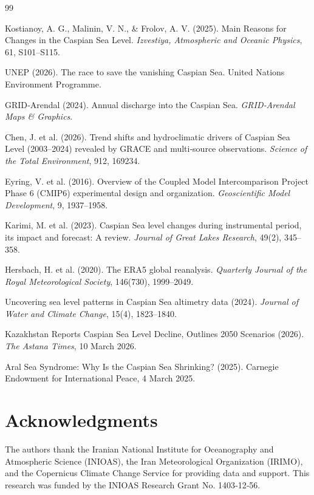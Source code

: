 \documentclass[12pt,a4paper]{article}
\begin{document}
\begin{thebibliography}{99}

Kostianoy, A. G., Malinin, V. N., \& Frolov, A. V. (2025).
Main Reasons for Changes in the Caspian Sea Level.
\textit{Izvestiya, Atmospheric and Oceanic Physics}, 61, S101–S115.

UNEP (2026).
The race to save the vanishing Caspian Sea.
United Nations Environment Programme.

GRID‑Arendal (2024).
Annual discharge into the Caspian Sea.
\textit{GRID‑Arendal Maps \& Graphics}.

Chen, J. et al. (2026).
Trend shifts and hydroclimatic drivers of Caspian Sea Level (2003–2024) revealed by GRACE and multi‑source observations.
\textit{Science of the Total Environment}, 912, 169234.

Eyring, V. et al. (2016).
Overview of the Coupled Model Intercomparison Project Phase 6 (CMIP6) experimental design and organization.
\textit{Geoscientific Model Development}, 9, 1937–1958.

Karimi, M. et al. (2023).
Caspian Sea level changes during instrumental period, its impact and forecast: A review.
\textit{Journal of Great Lakes Research}, 49(2), 345–358.

Hersbach, H. et al. (2020).
The ERA5 global reanalysis.
\textit{Quarterly Journal of the Royal Meteorological Society}, 146(730), 1999–2049.

Uncovering sea level patterns in Caspian Sea altimetry data (2024).
\textit{Journal of Water and Climate Change}, 15(4), 1823–1840.

Kazakhstan Reports Caspian Sea Level Decline, Outlines 2050 Scenarios (2026).
\textit{The Astana Times}, 10 March 2026.

Aral Sea Syndrome: Why Is the Caspian Sea Shrinking? (2025).
Carnegie Endowment for International Peace, 4 March 2025.

\end{thebibliography}

\section*{Acknowledgments}
The authors thank the Iranian National Institute for Oceanography and Atmospheric Science (INIOAS), the Iran Meteorological Organization (IRIMO), and the Copernicus Climate Change Service for providing data and support. This research was funded by the INIOAS Research Grant No. 1403‑12‑56.
\end{document}
